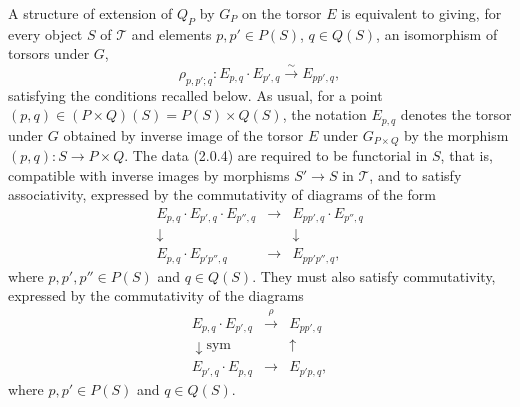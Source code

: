 \documentclass[11pt]{article}
\theoremstyle{plain}
\theoremstyle{definition}
\theoremstyle{remark}
\begin{document}
A structure of extension of $Q_P$ by $G_P$ on the torsor $E$ is equivalent to giving, for every object $S$ of $\mathcal T$ and elements $p,p'\in P(S)$, $q\in Q(S)$, an isomorphism of torsors under $G$,
\begin{equation}
\rho_{p,p';q}:E_{p,q}\cdot E_{p',q}\xrightarrow{\sim}E_{pp',q},
\tag{2.0.4}
\end{equation}
satisfying the conditions recalled below. As usual, for a point $(p,q)\in (P\times Q)(S)=P(S)\times Q(S)$, the notation $E_{p,q}$ denotes the torsor under $G$ obtained by inverse image of the torsor $E$ under $G_{P\times Q}$ by the morphism $(p,q):S\to P\times Q$. The data (2.0.4) are required to be functorial in $S$, that is, compatible with inverse images by morphisms $S'\to S$ in $\mathcal T$, and to satisfy associativity, expressed by the commutativity of diagrams of the form
\begin{equation}
\begin{array}{ccc}
E_{p,q}\cdot E_{p',q}\cdot E_{p'',q}&\longrightarrow&E_{pp',q}\cdot E_{p'',q}\\
\downarrow&&\downarrow\\
E_{p,q}\cdot E_{p'p'',q}&\longrightarrow&E_{pp'p'',q},
\end{array}
\tag{2.0.5}
\end{equation}
where $p,p',p''\in P(S)$ and $q\in Q(S)$. They must also satisfy commutativity, expressed by the commutativity of the diagrams
\begin{equation}
\begin{array}{ccc}
E_{p,q}\cdot E_{p',q}&\xrightarrow{\rho}&E_{pp',q}\\
\downarrow{\scriptstyle \mathrm{sym}}&&\uparrow\\
E_{p',q}\cdot E_{p,q}&\longrightarrow&E_{p'p,q},
\end{array}
\tag{2.0.6}
\end{equation}
where $p,p'\in P(S)$ and $q\in Q(S)$.
\end{document}
